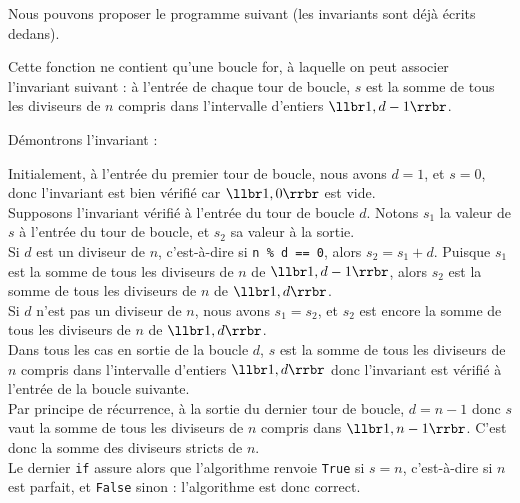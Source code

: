 \exer{}
\setcounter{numques}{0}

Nous pouvons proposer le programme suivant (les invariants sont déjà écrits dedans).


Cette fonction ne contient qu'une boucle for, à laquelle on peut associer l'invariant suivant : à l'entrée de 
chaque tour de boucle, $s$ est la somme de tous les diviseurs de 
$n$ compris dans l'intervalle d'entiers $\llbr 1,d-1\rrbr$.

Démontrons l'invariant : 

Initialement, à l'entrée du premier tour de boucle, nous avons $d=1$, et $s=0$, donc l'invariant est bien vérifié car 
$\llbr 1,0\rrbr$ est vide.\\
Supposons l'invariant vérifié à l'entrée du tour de boucle $d$. Notons $s_1$ la valeur de $s$ à l'entrée du tour de 
boucle, et $s_2$ sa valeur à la sortie.\\
Si $d$ est un diviseur de $n$, c'est-à-dire si \texttt{n \% d == 0}, alors $s_2=s_1+d$. Puisque 
$s_1$ est la somme de tous les diviseurs de $n$ de $\llbr 1,d-1\rrbr$, alors $s_2$ est la somme de tous les 
diviseurs de $n$ de $\llbr 1,d\rrbr$.\\
Si $d$ n'est pas un diviseur de $n$, nous avons $s_1=s_2$, et $s_2$ est encore la somme de tous les 
diviseurs de $n$ de $\llbr 1,d\rrbr$.\\
Dans tous les cas en sortie de la boucle $d$, $s$ est la somme de tous les diviseurs de 
$n$ compris dans l'intervalle d'entiers $\llbr 1,d\rrbr$ donc l'invariant est vérifié à l'entrée de la boucle 
suivante.\\

Par principe de récurrence, à la sortie du dernier tour de boucle, $d=n-1$ donc $s$ vaut la somme de tous les diviseurs 
de $n$ compris dans $\llbr 1,n-1\rrbr$. C'est donc la somme des diviseurs stricts de $n$.\\
Le dernier \texttt{if} assure alors que l'algorithme renvoie \texttt{True} si $s=n$, c'est-à-dire si $n$ est parfait, 
et \texttt{False} sinon : l'algorithme est donc correct.

